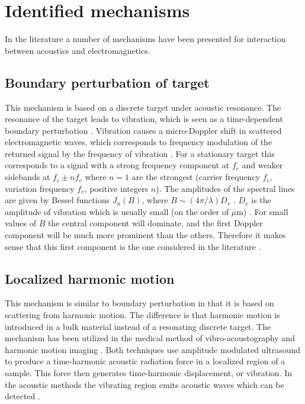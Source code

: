 \documentclass[10pt,a4paper,twocolumn,draft]{scrartcl}
\begin{document}
	\section{Identified mechanisms}
	In the literature a number of mechanisms have been presented for interaction between acoustics and electromagnetics.
	
	\subsection{Boundary perturbation of target}
	This mechanism is based on a discrete target under acoustic resonance. The resonance of the target leads to vibration, which is seen as a time-dependent boundary perturbation \cite{Buerkle2007}. Vibration causes a micro-Doppler shift in scattered electromagnetic waves, which corresponds to frequency modulation of the returned signal by the frequency of vibration \cite{Chen2006}. For a stationary target this corresponds to a signal with a strong frequency component at $f_c$ and weaker sidebands at $f_c \pm n f_v$ where $n=1$ are the strongest (carrier frequency $f_c$, variation frequency $f_v$, positive integers $n$). The amplitudes of the spectral lines are given by Bessel functions $J_n(B)$, where $B \sim (4\pi/\lambda)D_v$ \cite{Chen2006}. $D_v$ is the amplitude of vibration which is usually small (on the order of $\mu$m) \cite{Buerkle2007}\cite{Top2014}. For small values of $B$ the central component will dominate, and the first Doppler component will be much more prominent than the others. Therefore it makes sense that this first component is the one considered in the literature \cite{Buerkle2007}.
	
	\subsection{Localized harmonic motion}
	This mechanism is similar to boundary perturbation in that it is based on scattering from harmonic motion. The difference is that harmonic motion is introduced in a bulk material instead of a resonating discrete target. The mechanism has been utilized in the medical method of vibro-acoustography and harmonic motion imaging \cite{Wang2018}. Both techniques use amplitude modulated ultrasound to produce a time-harmonic acoustic radiation force in a localized region of a sample. This force then generates time-harmonic displacement, or vibration. In the acoustic methods the vibrating region emits acoustic waves which can be detected \cite{Fatemi1998}\cite{Konofagou2003}.
	
\end{document}
